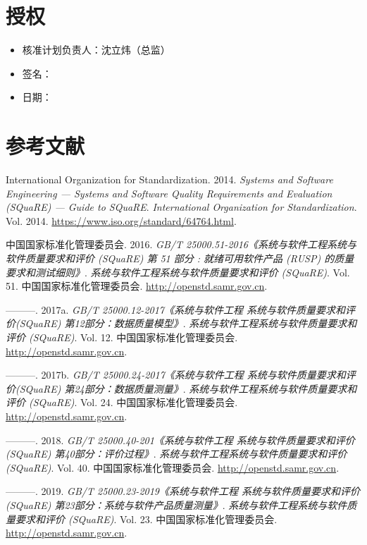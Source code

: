 \documentclass[hyperref, a4paper]{ctexart}
\providecommand{\tightlist}{%
  \setlength{\itemsep}{0pt}\setlength{\parskip}{0pt}}
\begin{document}
\hypertarget{ux6388ux6743}{%
\section{授权}\label{ux6388ux6743}}

\begin{itemize}
\tightlist
\item
  核准计划负责人：沈立炜（总监）
\item
  签名：
\item
  日期：
\end{itemize}

\pagebreak

\hypertarget{ux53c2ux8003ux6587ux732e}{%
\section*{参考文献}\label{ux53c2ux8003ux6587ux732e}}

\hypertarget{refs}{}
\leavevmode\hypertarget{ref-innovativeInternationalisation}{}%
International Organization for Standardization. 2014. \emph{Systems and
Software Engineering --- Systems and Software Quality Requirements and
Evaluation (SQuaRE) --- Guide to SQuaRE}. \emph{International
Organization for Standardization}. Vol. 2014.
\url{https://www.iso.org/standard/64764.html}.

\leavevmode\hypertarget{ref-innovative1}{}%
中国国家标准化管理委员会. 2016. \emph{GB/T
25000.51-2016《系统与软件工程系统与软件质量要求和评价 (SQuaRE) 第 51
部分 : 就绪可用软件产品 (RUSP) 的质量要求和测试细则》}.
\emph{系统与软件工程系统与软件质量要求和评价 (SQuaRE)}. Vol. 51.
中国国家标准化管理委员会. \url{http://openstd.samr.gov.cn}.

\leavevmode\hypertarget{ref-innovative3}{}%
---------. 2017a. \emph{GB/T 25000.12-2017《系统与软件工程
系统与软件质量要求和评价(SQuaRE) 第12部分：数据质量模型》}.
\emph{系统与软件工程系统与软件质量要求和评价 (SQuaRE)}. Vol. 12.
中国国家标准化管理委员会. \url{http://openstd.samr.gov.cn}.

\leavevmode\hypertarget{ref-innovative4}{}%
---------. 2017b. \emph{GB/T 25000.24-2017《系统与软件工程
系统与软件质量要求和评价(SQuaRE) 第24部分：数据质量测量》}.
\emph{系统与软件工程系统与软件质量要求和评价 (SQuaRE)}. Vol. 24.
中国国家标准化管理委员会. \url{http://openstd.samr.gov.cn}.

\leavevmode\hypertarget{ref-innovative5}{}%
---------. 2018. \emph{GB/T 25000.40-201《系统与软件工程
系统与软件质量要求和评价(SQuaRE) 第40部分：评价过程》}.
\emph{系统与软件工程系统与软件质量要求和评价 (SQuaRE)}. Vol. 40.
中国国家标准化管理委员会. \url{http://openstd.samr.gov.cn}.

\leavevmode\hypertarget{ref-innovative2}{}%
---------. 2019. \emph{GB/T 25000.23-2019《系统与软件工程
系统与软件质量要求和评价(SQuaRE) 第23部分：系统与软件产品质量测量》}.
\emph{系统与软件工程系统与软件质量要求和评价 (SQuaRE)}. Vol. 23.
中国国家标准化管理委员会. \url{http://openstd.samr.gov.cn}.
\end{document}
